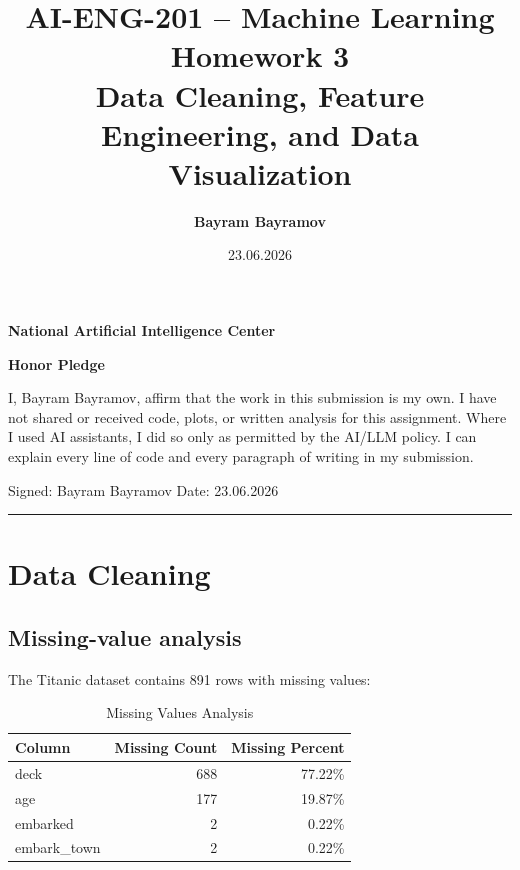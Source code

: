 \documentclass[12pt]{article}
\title{
    \vspace{-1.5cm}
    \textbf{AI-ENG-201 – Machine Learning}\\
    \textbf{Homework 3}\\
    \vspace{0.3cm}
    \large{Data Cleaning, Feature Engineering, and Data Visualization}
}
\author{\textbf{Bayram Bayramov}}
\date{23.06.2026}
\begin{document}
\maketitle
\thispagestyle{empty}

\begin{center}
    \large{\textbf{National Artificial Intelligence Center}}
\end{center}

\vspace{0.5cm}
\begin{center}
    \large{\textbf{Honor Pledge}}
\end{center}

\noindent
I, Bayram Bayramov, affirm that the work in this submission is my own. I have not shared or received code, plots, or written analysis for this assignment. Where I used AI assistants, I did so only as permitted by the AI/LLM policy. I can explain every line of code and every paragraph of writing in my submission.

\vspace{0.3cm}
Signed: Bayram Bayramov \hfill Date: 23.06.2026

\vspace{0.3cm}
\hrule

\newpage
\tableofcontents
\newpage


\section{Data Cleaning}

\subsection{Missing-value analysis}

The Titanic dataset contains 891 rows with missing values:

\begin{table}[H]
\centering
\small
\caption{Missing Values Analysis}
\begin{tabular}{l r r}
\toprule
\textbf{Column} & \textbf{Missing Count} & \textbf{Missing Percent} \\
\midrule
deck & 688 & 77.22\% \\
age & 177 & 19.87\% \\
embarked & 2 & 0.22\% \\
embark\_town & 2 & 0.22\% \\
\bottomrule
\end{tabular}
\end{table}
\end{document}
